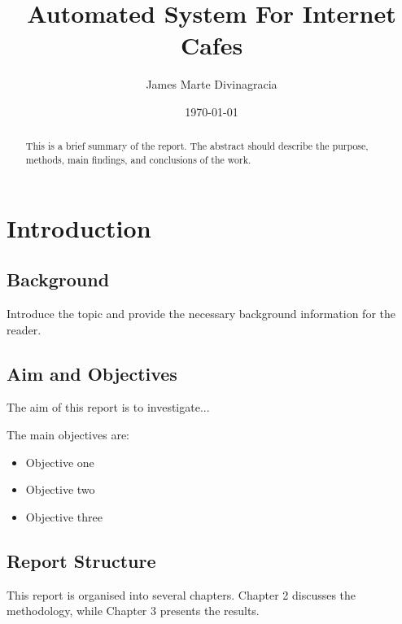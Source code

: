 \documentclass[12pt,a4paper]{report}
\title{\textbf{Automated System For Internet Cafes}}
\author{James Marte Divinagracia}
\date{\today}
\begin{document}
\maketitle

\begin{abstract}
This is a brief summary of the report. 
The abstract should describe the purpose, methods, main findings, 
and conclusions of the work.
\end{abstract}

\tableofcontents
\newpage

\chapter{Introduction}

\section{Background}

Introduce the topic and provide the necessary background
information for the reader.

\section{Aim and Objectives}

The aim of this report is to investigate...

The main objectives are:

\begin{itemize}
    \item Objective one
    \item Objective two
    \item Objective three
\end{itemize}

\section{Report Structure}

This report is organised into several chapters. 
Chapter 2 discusses the methodology, while Chapter 3 presents
the results.
\end{document}
